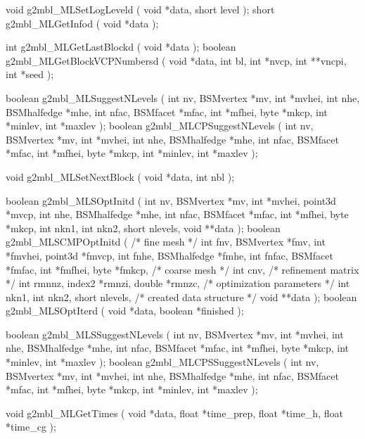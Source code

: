 \begin{listingC}
void g2mbl_MLSetLogLeveld ( void *data, short level );
short g2mbl_MLGetInfod ( void *data );

int g2mbl_MLGetLastBlockd ( void *data );
boolean g2mbl_MLGetBlockVCPNumbersd ( void *data, int bl,
                                      int *nvcp, int **vncpi, int *seed );

boolean g2mbl_MLSuggestNLevels ( int nv, BSMvertex *mv, int *mvhei,
                                 int nhe, BSMhalfedge *mhe,
                                 int nfac, BSMfacet *mfac, int *mfhei,
                                 byte *mkcp,
                                 int *minlev, int *maxlev );
boolean g2mbl_MLCPSuggestNLevels ( int nv, BSMvertex *mv, int *mvhei,
                                   int nhe, BSMhalfedge *mhe,
                                   int nfac, BSMfacet *mfac, int *mfhei,
                                   byte *mkcp,
                                   int *minlev, int *maxlev );

void g2mbl_MLSetNextBlock ( void *data, int nbl );
\end{listingC}

\begin{listingC}
boolean g2mbl_MLSOptInitd ( int nv, BSMvertex *mv, int *mvhei, point3d
*mvcp,
                            int nhe, BSMhalfedge *mhe,
                            int nfac, BSMfacet *mfac, int *mfhei,
                            byte *mkcp,
                            int nkn1, int nkn2, short nlevels, void **data
                            );
boolean g2mbl_MLSCMPOptInitd ( /* fine mesh */
                    int fnv, BSMvertex *fmv, int *fmvhei, point3d *fmvcp,
                    int fnhe, BSMhalfedge *fmhe,
                    int fnfac, BSMfacet *fmfac, int *fmfhei,
                    byte *fmkcp,
                           /* coarse mesh */
                    int cnv,
                           /* refinement matrix */
                    int rmnnz, index2 *rmnzi, double *rmnzc,
                           /* optimization parameters */
                    int nkn1, int nkn2, short nlevels,  
                           /* created data structure */ 
                    void **data );
boolean g2mbl_MLSOptIterd ( void *data, boolean *finished );
\end{listingC}

\begin{listingC}
boolean g2mbl_MLSSuggestNLevels ( int nv, BSMvertex *mv, int *mvhei,
                                  int nhe, BSMhalfedge *mhe,
                                  int nfac, BSMfacet *mfac, int *mfhei,
                                  byte *mkcp,
                                  int *minlev, int *maxlev );
boolean g2mbl_MLCPSSuggestNLevels ( int nv, BSMvertex *mv, int *mvhei,
                                    int nhe, BSMhalfedge *mhe,
                                    int nfac, BSMfacet *mfac, int *mfhei,
                                    byte *mkcp,
                                    int *minlev, int *maxlev );
\end{listingC}

\begin{listingC}
void g2mbl_MLGetTimes ( void *data,
                        float *time_prep, float *time_h, float *time_cg );
\end{listingC}

